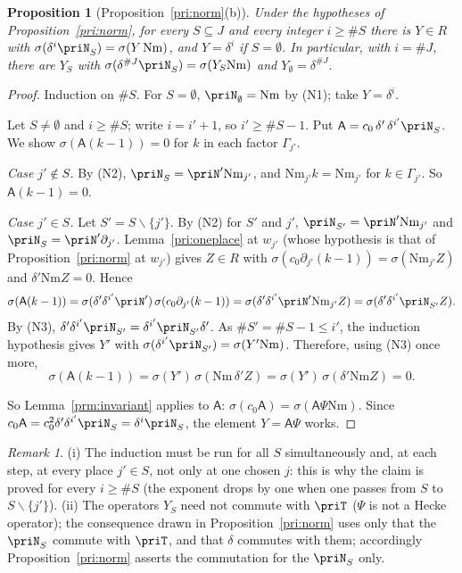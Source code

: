 \documentclass[10pt]{amsart}
\newtheorem{proposition}[theorem]{Proposition}
\theoremstyle{definition}
\theoremstyle{remark}
\newtheorem{remark}[theorem]{Remark}
\begin{document}
\begin{proposition}[Proposition~\ref{pri:norm}(b)]\label{prm:normb}
Under the hypotheses of Proposition~\ref{pri:norm}, for every $S\subseteq J$ and every integer $i\ge
\#S$ there is $Y\in R$ with $\sigma(\delta^i\priN_S)=\sigma(Y\,\mathrm{Nm})$, and $Y=\delta^i$ if
$S=\emptyset$. In particular, with $i=\#J$, there are $Y_S$ with $\sigma(\delta^{\#J}\priN_S)=
\sigma(Y_S\mathrm{Nm})$ and $Y_\emptyset=\delta^{\#J}$.
\end{proposition}
\begin{proof}
Induction on $\#S$. For $S=\emptyset$, $\priN_\emptyset=\mathrm{Nm}$ by (N1); take $Y=\delta^i$.

Let $S\ne\emptyset$ and $i\ge\#S$; write $i=i'+1$, so $i'\ge\#S-1$. Put $\mathsf A=c_0\,\delta'\,
\delta^{i'}\priN_S$. We show $\sigma(\mathsf A(k-1))=0$ for $k$ in each factor $\Gamma_{j'}$.

\emph{Case $j'\notin S$.} By (N2), $\priN_S=\priN'\mathrm{Nm}_{j'}$, and $\mathrm{Nm}_{j'}k=\mathrm{Nm}_{j'}$
for $k\in\Gamma_{j'}$. So $\mathsf A(k-1)=0$.

\emph{Case $j'\in S$.} Let $S'=S\smallsetminus\{j'\}$. By (N2) for $S'$ and $j'$, $\priN_{S'}=\priN'
\mathrm{Nm}_{j'}$ and $\priN_S=\priN'\partial_{j'}$. Lemma~\ref{pri:oneplace} at $w_{j'}$ (whose
hypothesis is that of Proposition~\ref{pri:norm} at $w_{j'}$) gives $Z\in R$ with $\sigma(c_0\partial_{j'}
(k-1))=\sigma(\mathrm{Nm}_{j'}Z)$ and $\delta'\mathrm{Nm}Z=0$. Hence
\[
\sigma(\mathsf A(k-1))=\sigma(\delta'\delta^{i'}\priN')\,\sigma(c_0\partial_{j'}(k-1))=
\sigma(\delta'\delta^{i'}\priN'\mathrm{Nm}_{j'}Z)=\sigma(\delta'\delta^{i'}\priN_{S'}Z).
\]
By (N3), $\delta'\delta^{i'}\priN_{S'}=\delta^{i'}\priN_{S'}\delta'$. As $\#S'=\#S-1\le i'$, the induction
hypothesis gives $Y'$ with $\sigma(\delta^{i'}\priN_{S'})=\sigma(Y'\mathrm{Nm})$. Therefore, using (N3)
once more,
\[
\sigma(\mathsf A(k-1))=\sigma(Y')\,\sigma(\mathrm{Nm}\,\delta'Z)=\sigma(Y')\,\sigma(\delta'\mathrm{Nm}Z)=0 .
\]

So Lemma~\ref{prm:invariant} applies to $\mathsf A$: $\sigma(c_0\mathsf A)=\sigma(\mathsf A\Psi
\mathrm{Nm})$. Since $c_0\mathsf A=c_0^2\delta'\delta^{i'}\priN_S=\delta^{i}\priN_S$, the element $Y=
\mathsf A\Psi$ works.
\end{proof}

\begin{remark}\label{prm:rem-norm}
(i) The induction must be run for all $S$ simultaneously and, at each step, at every place
$j'\in S$, not only at one chosen $j$: this is why the claim is proved for every $i\ge\#S$ (the
exponent drops by one when one passes from $S$ to $S\smallsetminus\{j'\}$). (ii) The operators $Y_S$
need not commute with $\priT$ ($\Psi$ is not a Hecke operator); the consequence drawn in
Proposition~\ref{pri:norm} uses only that the $\priN_S$ commute with $\priT$, and that $\delta$
commutes with them; accordingly Proposition~\ref{pri:norm} asserts the commutation for the
$\priN_S$ only.
\end{remark}
\end{document}
